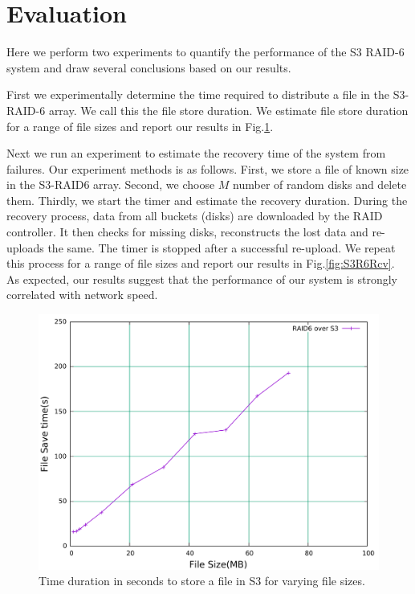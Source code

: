 \section{Evaluation}
\label{sec:evaluation}

Here we perform two experiments to quantify the performance of the S3 RAID-6 system and draw several conclusions based on our results.

First we experimentally determine the time required to distribute a file in the S3-RAID-6 array.
We call this the file store duration.
We estimate file store duration for a range of file sizes and report our results in Fig.\ref{fig:S3R6Str}.

Next we run an experiment to estimate the recovery time of the system from failures.
Our experiment methods is as follows.
First, we store a file of known size in the S3-RAID6 array.
Second, we choose $M$ number of random disks and delete them.
Thirdly, we start the timer and estimate the recovery duration.
During the recovery process, data from all buckets (disks) are downloaded by the RAID controller. 
It then checks for missing disks, reconstructs the lost data and re-uploads the same.
The timer is stopped after a successful re-upload.
We repeat this process for a range of file sizes and report our results in Fig.\ref{fig:S3R6Rcv}.
As expected, our results suggest that the performance of our system is strongly correlated with network speed.

\begin{figure}[h!]
\centering
\includegraphics[width=\linewidth]{figures/S3RAIDStoreTime.pdf}
\caption{Time duration in seconds to store a file in S3 for varying file sizes.}
\label{fig:S3R6Str}
\end{figure}

